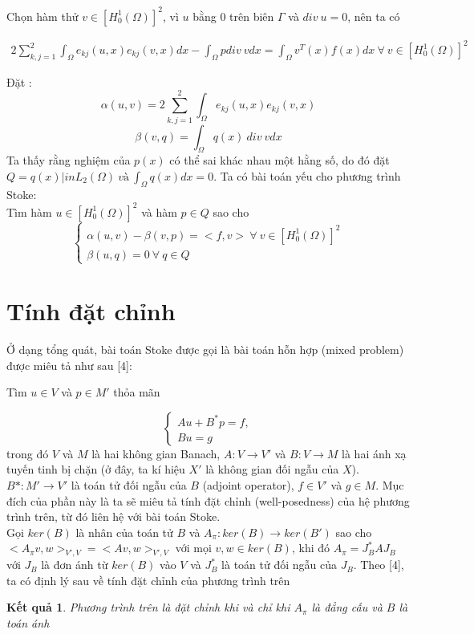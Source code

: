 \documentclass[14pt]{extreport}
\newtheorem{theorem}{\MakeUppercase{K}ết quả}[section]
\begin{document}
{Chọn hàm thử $v \in [ H_0^1(\Omega) ]^2$, vì $u$ bằng 0 trên biên $\Gamma$ và $div \ u = 0$, nên ta có

\begin{equation} \label{eq8}
\begin{split}
2 \sum_{k,j = 1}^2 \int_{\Omega} e_{kj}(u,x) e_{kj} (v,x) dx - \int_{\Omega} p div \ v dx = \int_{\Omega} v^T(x) f(x) dx \ \forall \ v \in [ H_0^1(\Omega) ]^2
\end{split}
\end{equation}

Đặt :
$$\alpha(u, v) = 2 \sum_{k,j = 1}^2 \int_{\Omega} e_{kj}(u,x) e_{kj} (v,x)$$
$$\beta(v, q) = \int_{\Omega} q(x) \ div \ v dx$$
Ta thấy rằng nghiệm của $p(x)$ có thể sai khác nhau một hằng số, do đó đặt $Q = {q(x) |in L_2(\Omega) \ và \ \int_{\Omega} q(x) dx = 0 }$. Ta có bài toán yếu cho phương trình Stoke: \\
Tìm hàm $u \in  [ H_0^1(\Omega) ]^2$ và hàm $p \in Q$ sao cho
$$
\begin{cases}
\alpha(u,v) - \beta(v, p) = <f, v> \ \forall \ v \in [ H_0^1(\Omega) ]^2 \\
\beta(u, q) = 0 \ \forall \ q \in Q
\end{cases}
$$

\section{Tính đặt chỉnh}
Ở dạng tổng quát, bài toán Stoke được gọi là bài toán hỗn hợp (mixed problem) được miêu tả như sau [4]:
\begin{center}
Tìm $u \in V$  và $p \in M'$  thỏa mãn
\end{center}
$$
\begin{cases}
Au + B^*p = f, \\
Bu = g
\end{cases}
$$
trong đó $V$ và $M$ là hai không gian Banach, $A: V \rightarrow V'$ và $B: V \rightarrow M$ là hai ánh xạ tuyến tinh bị chặn (ở đây, ta kí hiệu $X'$ là không gian đối ngẫu của $X$). $B*: M' \rightarrow V'$ là toán tử đối ngẫu của $B$ (adjoint operator), $f \in V'$ và $g \in M$. Mục đích của phần này là ta sẽ miêu tả tính đặt chỉnh (well-posedness) của hệ phương trình trên, từ đó liên hệ với bài toán Stoke. \\

Gọi $ker(B)$ là nhân của toán tử $B$ và $A_{\pi}: ker(B) \rightarrow ker(B')$ sao cho $<A_{\pi}v, w>_{V', V} = <Av, w>_{V', V}$ với mọi $v, w \in ker(B)$, khi đó $A_{\pi} = J_B^*AJ_B$ với $J_B$ là đơn ánh từ $ker(B)$ vào $V$ và $J_B^*$ là toán tử đối ngẫu của $J_B$. Theo [4], ta có định lý sau về tính đặt chỉnh của phương trình trên
\begin{theorem}
Phương trình trên là đặt chỉnh khi và chỉ khi $A_{\pi}$ là đẳng cấu và $B$ là toán ánh
\end{theorem}

}
\end{document}
